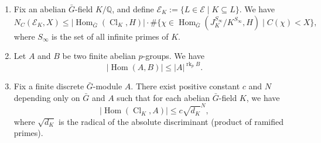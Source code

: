 \documentclass[10pt,a4paper]{amsart}
\begin{document}
\begin{lemma}\label{lemma of the lemma}
	\begin{enumerate}
		\item Fix an abelian $\bar{G}$-field $K/\mathbb{Q}$, and define $\mathcal{E}_K:=\{L\in\mathcal{E}\mid K\subseteq L\}$.
		We have
		\begin{equation*}
			N_C(\mathcal{E}_K,X)\leq\lvert\operatorname{Hom}_{\bar{G}}(\operatorname{Cl}_K,H)\rvert\cdot\#\{\chi\in\operatorname{Hom}_{\bar{G}}(J_K^{S_{\infty}}/K^{S_{\infty}}, H)\mid C(\chi)<X\},
		\end{equation*}
		where $S_{\infty}$ is the set of all infinite primes of $K$.
		\item Let $A$ and $B$ be two finite abelian $p$-groups.
		We have
		\begin{equation*}
			\lvert \operatorname{Hom}(A,B)\rvert\leq\lvert A\rvert^{\operatorname{rk}_p B}.
		\end{equation*}
		\item Fix a finite discrete $\bar{G}$-module $A$.
		There exist positive constant $c$ and $N$ depending only on $\bar{G}$ and $A$ such that for each abelian $\bar{G}$-field $K$, we have
		\begin{equation}\label{eqn: lemma of the lemma 1}
			\lvert\operatorname{Hom}(\operatorname{Cl}_K,A)\rvert\leq c\sqrt{d_K}^{N},
		\end{equation}
		where $\sqrt{d_K}$ is the radical of the absolute discriminant (product of ramified primes).
	\end{enumerate}
\end{lemma}
\end{document}
